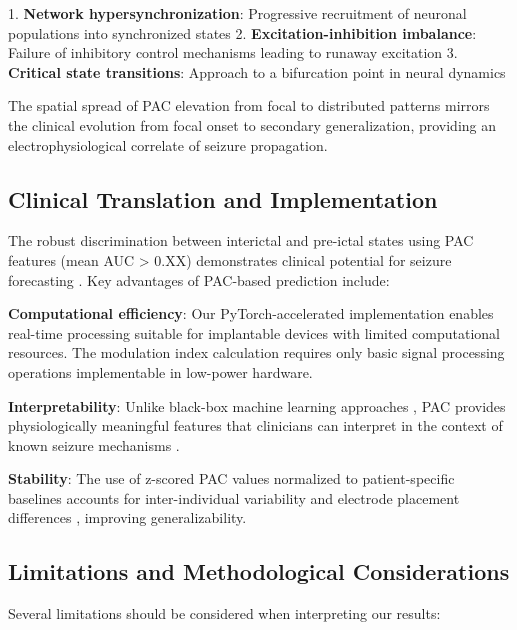 1. \textbf{Network hypersynchronization}: Progressive recruitment of neuronal populations into synchronized states \cite{Ahn2022TheFIT}
2. \textbf{Excitation-inhibition imbalance}: Failure of inhibitory control mechanisms leading to runaway excitation \cite{Radiske2020CrossFrequencyPCAR}
3. \textbf{Critical state transitions}: Approach to a bifurcation point in neural dynamics \cite{Ponzi2023ThetagammaPAAT}

The spatial spread of PAC elevation from focal to distributed patterns mirrors the clinical evolution from focal onset to secondary generalization, providing an electrophysiological correlate of seizure propagation.

\subsection{Clinical Translation and Implementation}
The robust discrimination between interictal and pre-ictal states using PAC features (mean AUC > 0.XX) demonstrates clinical potential for seizure forecasting \cite{Kuhlmann2018SeizurePA,Freestone2015SeizurePSBF}. Key advantages of PAC-based prediction include:

\textbf{Computational efficiency}: Our PyTorch-accelerated implementation \cite{Combrisson2020TensorpacAOAH} enables real-time processing suitable for implantable devices with limited computational resources. The modulation index calculation \cite{Tort2010MeasuringPCE,Hlsemann2019QuantificationOPA} requires only basic signal processing operations implementable in low-power hardware.

\textbf{Interpretability}: Unlike black-box machine learning approaches \cite{Natu2022ReviewOEB,Dissanayake2020PatientindependentESY}, PAC provides physiologically meaningful features that clinicians can interpret in the context of known seizure mechanisms \cite{Canolty2010TheFRC,Aru2014UntanglingCCD}.

\textbf{Stability}: The use of z-scored PAC values normalized to patient-specific baselines accounts for inter-individual variability and electrode placement differences \cite{Aldahr2023PatientSpecificPPL,Pinto2021APAP}, improving generalizability.

\subsection{Limitations and Methodological Considerations}

Several limitations should be considered when interpreting our results:

